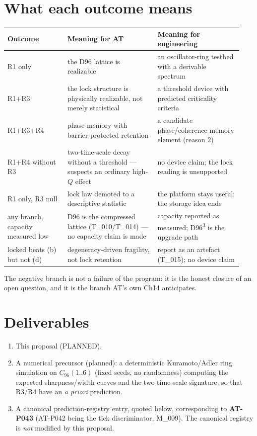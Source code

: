 \documentclass[11pt,a4paper]{article}
\newcommand{\Cninety}{\ensuremath{C_{96}(1..6)}}
\begin{document}
\section{What each outcome means}

\begin{table}[h]
\centering
\small
\begin{tabular}{@{}p{0.24\linewidth}p{0.36\linewidth}p{0.34\linewidth}@{}}
\toprule
Outcome & Meaning for AT & Meaning for engineering \\
\midrule
R1 only & the D96 lattice is realizable & an oscillator-ring testbed with a derivable spectrum \\
R1+R3 & the lock structure is physically realizable, not merely statistical & a threshold device
with predicted criticality criteria \\
R1+R3+R4 & phase memory with barrier-protected retention & a candidate phase/coherence memory
element (reason 2) \\
R1+R4 without R3 & two-time-scale decay without a threshold --- suspects an ordinary high-$Q$ effect
& no device claim; the lock reading is unsupported \\
R1 only, R3 null & lock law demoted to a descriptive statistic & the platform stays useful; the
storage idea ends \\
any branch, capacity measured low & D96 is the compressed lattice (T\_010/T\_014) --- no capacity
claim is made & capacity reported as measured; D96\textsuperscript{3} is the upgrade path \\
locked beats (b) but not (d) & degeneracy-driven fragility, not lock retention & report as an
artefact (T\_015); no device claim \\
\bottomrule
\end{tabular}
\end{table}

\noindent The negative branch is not a failure of the program: it is the honest closure of an open
question, and it is the branch AT's own Ch14 anticipates.

\section{Deliverables}

\begin{enumerate}[leftmargin=1.4em]
\item This proposal (PLANNED).
\item A numerical precursor (planned): a deterministic Kuramoto/Adler ring simulation on
\Cninety{} (fixed seeds, no randomness) computing the expected sharpness/width curves and the
two-time-scale signature, so that R3/R4 have an \emph{a priori} prediction.
\item A canonical prediction-registry entry, quoted below, corresponding to \textbf{AT-P043}
(AT-P042 being the tick discriminator, M\_009). The canonical registry is \emph{not} modified by
this proposal.
\end{enumerate}
\end{document}
